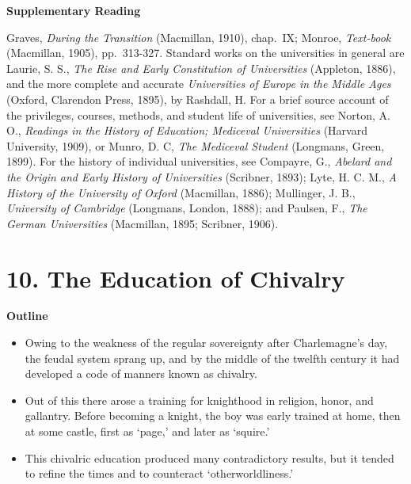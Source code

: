 \documentclass[
]{book}
\providecommand{\tightlist}{%
  \setlength{\itemsep}{0pt}\setlength{\parskip}{0pt}}
\begin{document}
\textbf{Supplementary Reading}

Graves, \emph{During the Transition} (Macmillan, 1910), chap.~IX; Monroe, \emph{Text-book} (Macmillan, 1905), pp.~313-327. Standard works on the universities in general are Laurie, S. S., \emph{The Rise and Early Constitution of Universities} (Appleton, 1886), and the more complete and accurate \emph{Universities of Europe in the Middle Ages} (Oxford, Clarendon Press, 1895), by Rashdall, H. For a brief source account of the privileges, courses, methods, and student life of universities, see Norton, A. O., \emph{Readings in the History of Education; Mediceval Universities} (Harvard University, 1909), or Munro, D. C, \emph{The Mediceval Student} (Longmans, Green, 1899). For the history of individual universities, see Compayre, G.,\protect\hypertarget{ch9.xmlux5cux23para.125.1.0.box.327.250.1048.219.q.50}{}{ \emph{Abelard and the Origin and Early History of Universities} (Scribner, 1893); Lyte, H. C. M., \emph{A History of the University of Oxford} (Macmillan, 1886); Mullinger, J. B., \emph{University of Cambridge} (Longmans, London, 1888); and Paulsen, F., \emph{The German Universities} (Macmillan, 1895; Scribner, 1906).}

\hypertarget{the-education-of-chivalry}{%
\chapter{10. The Education of Chivalry}\label{the-education-of-chivalry}}

\textbf{Outline}

\begin{itemize}
\tightlist
\item
  Owing to the weakness of the regular sovereignty after Charlemagne's day, the feudal system sprang up, and by the middle of the twelfth century it had developed a code of manners known as chivalry.
\item
  Out of this there arose a training for knighthood in religion, honor, and gallantry. Before becoming a knight, the boy was early trained at home, then at some castle, first as `page,' and later as `squire.'
\item
  This chivalric education produced many contradictory results, but it tended to refine the times and to counteract `otherworldliness.'
\end{itemize}
\end{document}
